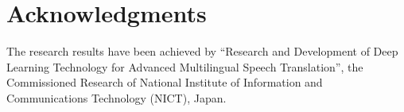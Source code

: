 \documentclass[11pt,a4paper]{article}
\begin{document}
\section*{Acknowledgments}
The research results have been achieved by ``Research and Development of Deep Learning Technology for Advanced Multilingual Speech Translation'', the Commissioned Research of National Institute of Information and Communications Technology (NICT), Japan.



\end{document}
